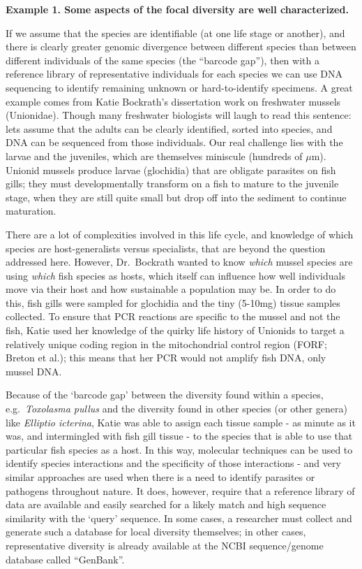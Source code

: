 \documentclass[
]{article}
\begin{document}
\textbf{Example 1. Some aspects of the focal diversity are well
characterized.}

If we assume that the species are identifiable (at one life stage or
another), and there is clearly greater genomic divergence between
different species than between different individuals of the same species
(the ``barcode gap''), then with a reference library of representative
individuals for each species we can use DNA sequencing to identify
remaining unknown or hard-to-identify specimens. A great example comes
from Katie Bockrath's dissertation work on freshwater mussels
(Unionidae). Though many freshwater biologists will laugh to read this
sentence: lets assume that the adults can be clearly identified, sorted
into species, and DNA can be sequenced from those individuals. Our real
challenge lies with the larvae and the juveniles, which are themselves
miniscule (hundreds of \(\mu\)m). Unionid mussels produce larvae
(glochidia) that are obligate parasites on fish gills; they must
developmentally transform on a fish to mature to the juvenile stage,
when they are still quite small but drop off into the sediment to
continue maturation.

There are a lot of complexities involved in this life cycle, and
knowledge of which species are host-generalists versus specialists, that
are beyond the question addressed here. However, Dr.~Bockrath wanted to
know \emph{which} mussel species are using \emph{which} fish species as
hosts, which itself can influence how well individuals move via their
host and how sustainable a population may be. In order to do this, fish
gills were sampled for glochidia and the tiny (5-10mg) tissue samples
collected. To ensure that PCR reactions are specific to the mussel and
not the fish, Katie used her knowledge of the quirky life history of
Unionids to target a relatively unique coding region in the
mitochondrial control region (FORF; Breton et al.); this means that her
PCR would not amplify fish DNA, only mussel DNA.

Because of the `barcode gap' between the diversity found within a
species, e.g.~\emph{Toxolasma pullus} and the diversity found in other
species (or other genera) like \emph{Elliptio icterina}, Katie was able
to assign each tissue sample - as minute as it was, and intermingled
with fish gill tissue - to the species that is able to use that
particular fish species as a host. In this way, molecular techniques can
be used to identify species interactions and the specificity of those
interactions - and very similar approaches are used when there is a need
to identify parasites or pathogens throughout nature. It does, however,
require that a reference library of data are available and easily
searched for a likely match and high sequence similarity with the
`query' sequence. In some cases, a researcher must collect and generate
such a database for local diversity themselves; in other cases,
representative diversity is already available at the NCBI
sequence/genome database called ``GenBank''.
\end{document}
